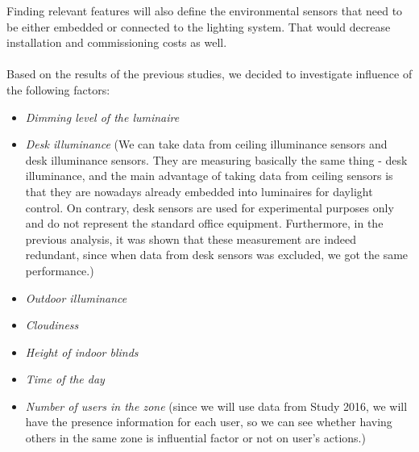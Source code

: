 \documentclass[a4paper]{article}
\begin{document}
\begin{enumerate}[I]
 Finding relevant features will also define the environmental sensors that need to be either embedded or connected to the lighting system. That would decrease installation and commissioning costs as well. 
\\\\
Based on the results of the previous studies, we decided to investigate influence of the following factors:
\begin{itemize}
\item \textit{Dimming level of the luminaire}
\item \textit{Desk illuminance} \color{red} (We can take data from ceiling illuminance sensors and desk illuminance sensors. They are measuring basically the same thing - desk illuminance, and the main advantage of taking data from ceiling sensors is that they are nowadays already embedded into luminaires for daylight control. On contrary, desk sensors are used for experimental purposes only and do not represent the standard office equipment. Furthermore, in the previous analysis, it was shown that these measurement are indeed redundant, since when data from desk sensors was excluded, we got the same performance.) \color{black}
\item \textit{Outdoor illuminance}
\item \textit{Cloudiness}
\item \textit{Height of indoor blinds}
\item \textit{Time of the day}
\item \color{red}\textit{ Number of users in the zone} (since we will use data from Study 2016, we will have the presence information for each user, so we can see whether having others in the same zone is influential factor or not on user's actions.)
\end{itemize}


\end{enumerate}
\end{document}
